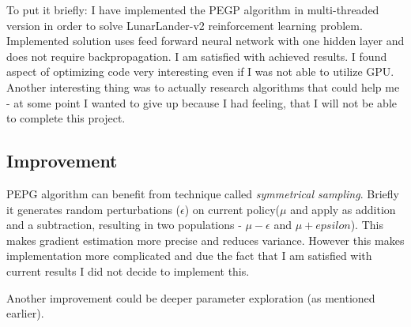 \documentclass[12pt]{article}
\begin{document}
To put it briefly: I have implemented the PEGP algorithm in multi-threaded version in order to solve LunarLander-v2 reinforcement learning problem. Implemented solution uses feed forward neural network with one hidden layer and does not require backpropagation. I am satisfied with achieved results. I found aspect of optimizing code very interesting even if I was not able to utilize GPU. Another interesting thing was to actually research algorithms that could help me - at some point I wanted to give up because I had feeling, that I will not be able to complete this project.

\subsection{Improvement}

PEPG algorithm can benefit from technique called \emph{symmetrical sampling}. Briefly it generates random perturbations ($\epsilon$) on current policy($\mu$ and apply as addition and a subtraction, resulting in two populations - $\mu - \epsilon$ and $\mu + epsilon$). This makes gradient estimation more precise and reduces variance. However this makes implementation more complicated and due the fact that I am satisfied with current results I did not decide to implement this.

Another improvement could be deeper parameter exploration (as mentioned earlier).


\newpage


 
\end{document}

